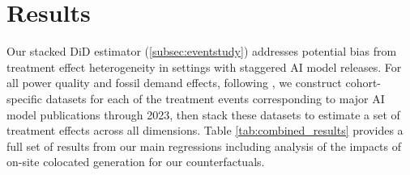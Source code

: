 \documentclass[sigconf]{acmart}
\newcommand{\nb}[1]{\textcolor{blue}{NB[#1]}}
\begin{document}



\section{Results}\label{Sec::Results}
Our stacked DiD estimator (\autoref{subsec:eventstudy}) addresses potential bias from treatment effect heterogeneity in settings with staggered AI model releases. For all power quality and fossil demand effects, following \citet{callaway2021difference}, we construct cohort-specific datasets for each of the treatment events corresponding to major AI model publications through 2023, then stack these datasets to estimate a set of treatment effects across all dimensions. Table \ref{tab:combined_results} provides a full set of results from our main regressions including analysis of the impacts of on-site colocated generation for our counterfactuals.
\end{document}
